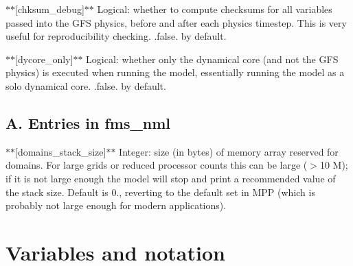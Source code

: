 $\ast$$\ast$\mbox{[}chksum\-\_\-debug\mbox{]}$\ast$$\ast$ Logical\-: whether to compute checksums for all variables passed into the G\-F\-S physics, before and after each physics timestep. This is very useful for reproducibility checking. .false. by default.

$\ast$$\ast$\mbox{[}dycore\-\_\-only\mbox{]}$\ast$$\ast$ Logical\-: whether only the dynamical core (and not the G\-F\-S physics) is executed when running the model, essentially running the model as a solo dynamical core. .false. by default.

\subsection*{A. Entries in fms\-\_\-nml}

$\ast$$\ast$\mbox{[}domains\-\_\-stack\-\_\-size\mbox{]}$\ast$$\ast$ Integer\-: size (in bytes) of memory array reserved for domains. For large grids or reduced processor counts this can be large ($>$10 M); if it is not large enough the model will stop and print a recommended value of the stack size. Default is 0., reverting to the default set in M\-P\-P (which is probably not large enough for modern applications). \hypertarget{variables}{}\section{Variables and notation}\label{variables}
